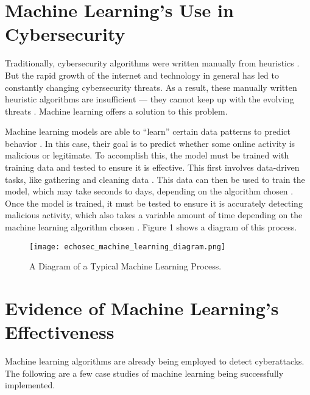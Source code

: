 \section{Machine Learning's Use in Cybersecurity}

Traditionally, cybersecurity algorithms were written manually from heuristics \cite{sarker_kayes_badsha_2020}.
But the rapid growth of the internet and technology in general has led to constantly changing cybersecurity threats.
As a result, these manually written heuristic algorithms are insufficient --- they cannot keep up with the evolving threats \cite{sarker_kayes_badsha_2020}.
Machine learning offers a solution to this problem.

Machine learning models are able to ``learn'' certain data patterns to predict behavior \cite{sarker_kayes_badsha_2020}.
In this case, their goal is to predict whether some online activity is malicious or legitimate.
To accomplish this, the model must be trained with training data and tested to ensure it is effective.
This first involves data-driven tasks, like gathering and cleaning data \cite{sarker_kayes_badsha_2020}.
This data can then be used to train the model, which may take seconds to days, depending on the algorithm chosen \cite{xin2018}.
Once the model is trained, it must be tested to ensure it is accurately detecting malicious activity, which also takes a variable amount of time depending on the machine learning algorithm chosen \cite{xin2018}.
Figure 1 shows a diagram of this process.

\begin{figure}[H]
    \centering
    \texttt{[image: echosec\_machine\_learning\_diagram.png]}
    \caption{A Diagram of a Typical Machine Learning Process. \cite{echosec}}
\end{figure}

\section{Evidence of Machine Learning's Effectiveness}
Machine learning algorithms are already being employed to detect cyberattacks.
The following are a few case studies of machine learning being successfully implemented.

